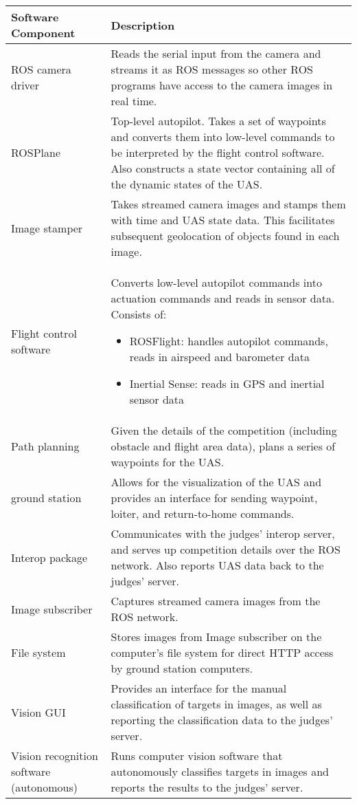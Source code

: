 \documentclass[]{auvsi_doc}
\begin{document}
\newpage
\vspace*{-1.25cm}
\begin{center}

	\centering
	\bgroup
	\def\arraystretch{1.25}%
	\begin{tabular}{ P{5cm}P{10cm} }
		\hline
		\textbf{Software Component} 	& \textbf{Description} \\
		\hline
		ROS camera driver & Reads the serial input from the camera and streams it as ROS messages so other ROS programs have access to the camera images in real time.  \\
		ROSPlane & Top-level autopilot. Takes a set of waypoints and converts them into low-level commands to be interpreted by the flight control software. Also constructs a state vector containing all of the dynamic states of the UAS. \\
		Image stamper & Takes streamed camera images and stamps them with time and UAS state data. This facilitates subsequent geolocation of objects found in each image.  \\
		Flight control software & Converts low-level autopilot commands into actuation commands and reads in sensor data. Consists of: \begin{itemize} \item ROSFlight: handles autopilot commands, reads in airspeed and barometer data
		\item Inertial Sense: reads in GPS and inertial sensor data \end{itemize}  \\[-0.5cm]
		Path planning & Given the details of the competition (including obstacle and flight area data), plans a series of waypoints for the UAS. \\
		ground station & Allows for the visualization of the UAS and provides an interface for sending waypoint, loiter, and return-to-home commands.  \\
		Interop package & Communicates with the judges' interop server, and serves up competition details over the ROS network. Also reports UAS data back to the judges' server. \\
		Image subscriber & Captures streamed camera images from the ROS network. \\
		File system & Stores images from Image subscriber on the computer's file system for direct HTTP access by ground station computers.  \\
		Vision GUI & Provides an interface for the manual classification of targets in images, as well as reporting the classification data to the judges' server.  \\
		Vision recognition software (autonomous) & Runs computer vision software that autonomously classifies targets in images and reports the results to the judges' server. \\
		\hline
	\end{tabular}
	\egroup
	\label{table:comp-des}
\end{center}
\end{document}
